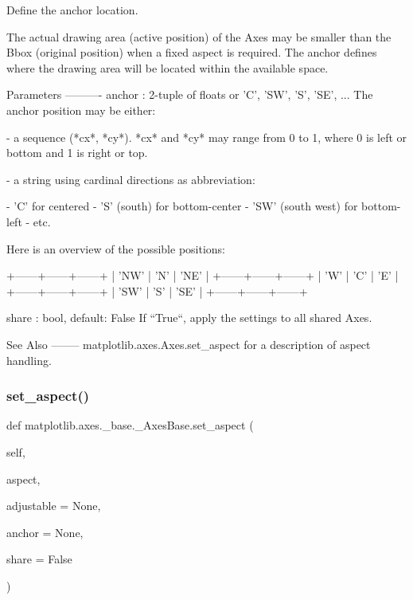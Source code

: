 \begin{DoxyVerb}Define the anchor location.

The actual drawing area (active position) of the Axes may be smaller
than the Bbox (original position) when a fixed aspect is required. The
anchor defines where the drawing area will be located within the
available space.

Parameters
----------
anchor : 2-tuple of floats or {'C', 'SW', 'S', 'SE', ...}
    The anchor position may be either:

    - a sequence (*cx*, *cy*). *cx* and *cy* may range from 0
      to 1, where 0 is left or bottom and 1 is right or top.

    - a string using cardinal directions as abbreviation:

      - 'C' for centered
      - 'S' (south) for bottom-center
      - 'SW' (south west) for bottom-left
      - etc.

      Here is an overview of the possible positions:

      +------+------+------+
      | 'NW' | 'N'  | 'NE' |
      +------+------+------+
      | 'W'  | 'C'  | 'E'  |
      +------+------+------+
      | 'SW' | 'S'  | 'SE' |
      +------+------+------+

share : bool, default: False
    If ``True``, apply the settings to all shared Axes.

See Also
--------
matplotlib.axes.Axes.set_aspect
    for a description of aspect handling.
\end{DoxyVerb}
 \mbox{\label{classmatplotlib_1_1axes_1_1__base_1_1__AxesBase_acab77334c3a0b4d7259b924ca5c83158}} 
\subsubsection{\texorpdfstring{set\+\_\+aspect()}{set\_aspect()}}
{\footnotesize\ttfamily def matplotlib.\+axes.\+\_\+base.\+\_\+\+Axes\+Base.\+set\+\_\+aspect (\begin{DoxyParamCaption}\item[{}]{self,  }\item[{}]{aspect,  }\item[{}]{adjustable = {\ttfamily None},  }\item[{}]{anchor = {\ttfamily None},  }\item[{}]{share = {\ttfamily False} }\end{DoxyParamCaption})}

